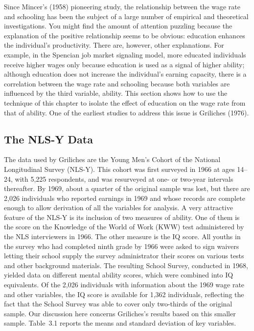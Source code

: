
Since Mincer's (1958) pioneering study, the relationship between the wage rate
and schooling has been the subject of a large number of empirical and theoretical
investigations.  You might find the amount of attention puzzling because the
explanation of the positive relationship seems to be obvious: education enhances
the individual's productivity.  There are, however, other explanations.  For example,
in the Spencian job market signaling model, more educated individuals receive
higher wages only because education is used as a signal of higher ability; although
education does not increase the individual's earning capacity, there is a correlation
between the wage rate and schooling because both variables are influenced by the
third variable, ability.  This section shows how to use the technique of this chapter
to isolate the effect of education on the wage rate from that of ability.  One of the
earliest studies to address this issue is Griliches (1976).

\subsection*{The NLS-Y Data}

The data used by Griliches are the Young Men's Cohort of the National Longitudinal
Survey (NLS-Y).  This cohort was first surveyed in 1966 at ages 14--24, with
5,225 respondents, and was resurveyed at one- or two-year intervals thereafter.  By
1969, about a quarter of the original sample was lost, but there are 2,026 individuals
who reported earnings in 1969 and whose records are complete enough to
allow derivation of all the variables for analysis.  A very attractive feature of the
NLS-Y is its inclusion of two measures of ability.  One of them is the score on
the Knowledge of the World of Work (KWW) test administered by the NLS interviewers
in 1966.  The other measure is the IQ score.  All youths in the survey who
had completed ninth grade by 1966 were asked to sign waivers letting their school
supply the survey administrator their scores on various tests and other background
materials.  The resulting School Survey, conducted in 1968, yielded data on different
mental ability scores, which were combined into IQ equivalents.  Of the 2,026
individuals with information about the 1969 wage rate and other variables, the IQ
score is available for 1,362 individuals, reflecting the fact that the School Survey
was able to cover only two-thirds of the original sample.  Our discussion here concerns
Griliches's results based on this smaller sample.  Table~3.1 reports the means
and standard deviation of key variables.

